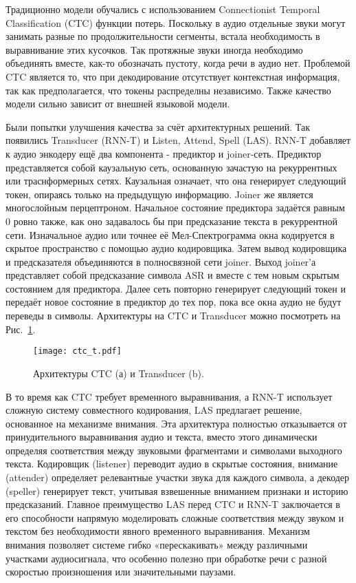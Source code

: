 Традиционно модели обучались с использованием Connectionist Temporal Classification (CTC) функции потерь.
Поскольку в аудио отдельные звуки могут занимать разные по продолжительности сегменты, встала необходимость в выравнивание этих кусочков.
Так протяжные звуки иногда необходимо объединять вместе, как-то обозначать пустоту, когда речи в аудио нет.
Проблемой CTC является то, что при декодирование отсутствует контекстная информация, так как предполагается, что токены распределны независимо.
Также качество модели сильно зависит от внешней языковой модели.

Были попытки улучшения качества за счёт архитектурных решений.
Так появились Transducer (RNN-T) и Listen, Attend, Spell (LAS).
RNN-T добавляет к аудио энкодеру ещё два компонента - предиктор и joiner-сеть.
Предиктор представляется собой каузальную сеть, основанную зачастую на рекуррентных или траснформерных сетях.
Каузальная означает, что она генерирует следующий токен, опираясь только на предыдущую информацию.
Joiner же является многослойным перцептроном.
Начальное состояние предиктора задаётся равным 0 ровно также, как оно задавалось бы при предсказание текста в рекуррентной сети.
Изначальное аудио или точнее её Мел-Спектрограмма окна кодируется в скрытое пространство с помощью аудио кодировщика.
Затем вывод кодировщика и предсказателя объединяются в полносвязной сети joiner.
Выход joiner'а представляет собой предсказание символа ASR и вместе с тем новым скрытым состоянием для предиктора.
Далее сеть повторно генерирует следующий токен и передаёт новое состояние в предиктор до тех пор, пока все окна аудио не будут переведы в символы.
Архитектуры на CTC и Transducer можно посмотреть на Рис.~\ref{fig:ctc_t}.

\begin{figure}[!t]
  \centering
  \texttt{[image: ctc\_t.pdf]}
  \caption{Архитектуры CTC (а) и Transducer (b).}
  \label{fig:ctc_t}
\end{figure}

В то время как CTC требует временного выравнивания, а RNN-T использует сложную систему совместного кодирования, LAS предлагает решение, основанное на механизме внимания.
Эта архитектура полностью отказывается от принудительного выравнивания аудио и текста, вместо этого динамически определяя соответствия между звуковыми фрагментами и символами выходного текста.
Кодировщик (listener) переводит аудио в скрытые состояния, внимание (attender) определяет релевантные участки звука для каждого символа, а декодер (speller) генерирует текст, учитывая взвешенные вниманием признаки и историю предсказаний.
Главное преимущество LAS перед CTC и RNN-T заключается в его способности напрямую моделировать сложные соответствия между звуком и текстом без необходимости явного временного выравнивания.
Механизм внимания позволяет системе гибко «перескакивать» между различными участками аудиосигнала, что особенно полезно при обработке речи с разной скоростью произношения или значительными паузами.

